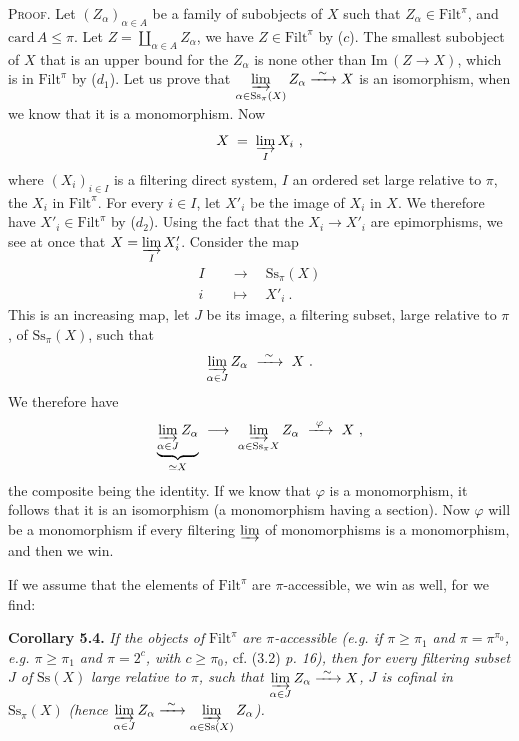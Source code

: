 \documentclass[11pt]{article}
\newcommand{\printedpage}[1]{\marginpar{\footnotesize p.~#1}}
\newcommand{\msp}[1]{\marginpar{\footnotesize [#1]}}
\newcommand{\Filt}{\mathrm{Filt}}
\newcommand{\Ss}{\mathrm{Ss}}
\newcommand{\Img}{\mathrm{Im}\,}
\newcommand{\card}{\mathrm{card}\,}
\newcommand{\isoto}{\xrightarrow{\ \sim\ }}
\begin{document}
\msp{page 47}
\textsc{Proof}. Let $(Z_{\alpha})_{\alpha\in A}$ be a family of subobjects of $X$ such that $Z_{\alpha} \in \Filt^{\pi}$, and $\card A \leq \pi$. Let $Z = \coprod_{\alpha\in A} Z_{\alpha}$, we have $Z \in \Filt^{\pi}$ by ($c$). The smallest subobject of $X$ that is an upper bound for the $Z_{\alpha}$ is none other than $\Img (Z \longrightarrow X)$, which is in $\Filt^{\pi}$ by ($d_1$). Let us prove that $\varinjlim\limits_{\alpha\in\Ss_{\pi}(X)} Z_{\alpha} \isoto X$ is an isomorphism, when we know that it is a monomorphism. Now
\[
X \;=\; \varinjlim_{I} X_i \ ,
\]
where $(X_i)_{i\in I}$ is a filtering direct system, $I$ an ordered set large relative to $\pi$, the $X_i$ in $\Filt^{\pi}$. For every $i \in I$, let $X'_i$ be the image of $X_i$ in $X$. We therefore have $X'_i \in \Filt^{\pi}$ by ($d_2$). Using the fact that the $X_i \longrightarrow X'_i$ are epimorphisms, we see at once that $X = \varinjlim\limits_{I} X'_i$. Consider the map
\[
\begin{aligned}
I \quad &\longrightarrow \quad \Ss_{\pi}(X)\\
i \quad &\longmapsto \quad X'_i \ .
\end{aligned}
\]
This is an increasing map, let $J$ be its image, a filtering subset, large relative to $\pi$, of $\Ss_{\pi}(X)$, such that
\[
\varinjlim_{\alpha\in J} Z_{\alpha} \ \isoto \ X \ .
\]
\msp{page 48}
We therefore have
\[
\underbrace{\varinjlim_{\alpha\in J} Z_{\alpha}}_{\simeq X} \ \longrightarrow \ \varinjlim_{\alpha\in\Ss_{\pi}X} Z_{\alpha} \ \xrightarrow{\ \varphi\ } \ X \ ,
\]
the composite being the identity. If we know that $\varphi$ is a monomorphism, it follows that it is an isomorphism (a monomorphism having a section). Now $\varphi$ will be a monomorphism if every filtering $\varinjlim$ of monomorphisms is a monomorphism, and then we win.

\printedpage{31}

If we assume that the elements of $\Filt^{\pi}$ are $\pi$-accessible, we win as well, for we find:

\textbf{Corollary 5.4.} \textit{If the objects of} $\Filt^{\pi}$ \textit{are $\pi$-accessible (e.g. if $\pi \geq \pi_1$ and $\pi = \pi^{\pi_0}$, e.g. $\pi \geq \pi_1$ and $\pi = 2^{c}$, with $c \geq \pi_0$,} cf. (3.2) \textit{p. 16), then for every filtering subset $J$ of} $\Ss(X)$ \textit{large relative to $\pi$, such that $\varinjlim\limits_{\alpha\in J} Z_{\alpha} \isoto X$, $J$ is cofinal in} $\Ss_{\pi}(X)$ \textit{(hence $\varinjlim\limits_{\alpha\in J} Z_{\alpha} \isoto \varinjlim\limits_{\alpha\in\Ss(X)} Z_{\alpha}$).}
\end{document}
